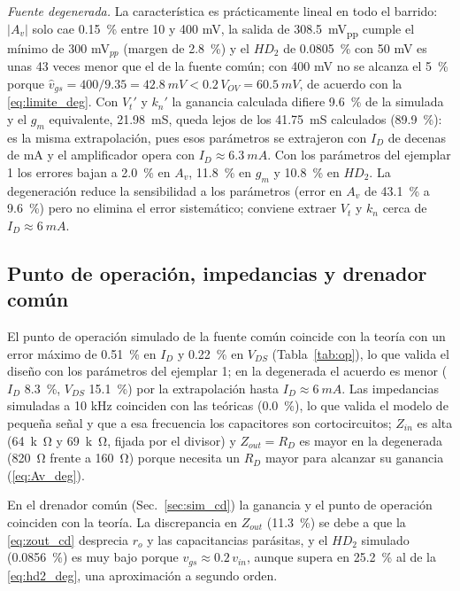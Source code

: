 \documentclass[conference]{IEEEtran}
\newcommand{\gm}{g_m}
\newcommand{\kn}{k_n}
\newcommand{\Vov}{V_{OV}}
\newcommand{\Vtp}{V_t'}
\newcommand{\knp}{k_n'}
\begin{document}
\textit{Fuente degenerada.} La característica es prácticamente lineal en todo el barrido: $|A_v|$ solo cae \SI{0.15}{\percent} entre 10 y 400 mV, la salida de \SI{308.5}{mV_{pp}} cumple el mínimo de 300 mV$_{pp}$ (margen de \SI{2.8}{\percent}) y el $HD_2$ de \SI{0.0805}{\percent} con 50 mV es unas 43 veces menor que el de la fuente común; con 400 mV no se alcanza el \SI{5}{\percent} porque $\hat v_{gs}=400/9.35=\SI{42.8}{mV}<0.2\,\Vov=\SI{60.5}{mV}$, de acuerdo con la \eqref{eq:limite_deg}. Con $\Vtp$ y $\knp$ la ganancia calculada difiere \SI{9.6}{\percent} de la simulada y el $\gm$ equivalente, \SI{21.98}{mS}, queda lejos de los \SI{41.75}{mS} calculados (\SI{89.9}{\percent}): es la misma extrapolación, pues esos parámetros se extrajeron con $I_D$ de decenas de mA y el amplificador opera con $I_D\approx\SI{6.3}{mA}$. Con los parámetros del ejemplar 1 los errores bajan a \SI{2.0}{\percent} en $A_v$, \SI{11.8}{\percent} en $\gm$ y \SI{10.8}{\percent} en $HD_2$. La degeneración reduce la sensibilidad a los parámetros (error en $A_v$ de \SI{43.1}{\percent} a \SI{9.6}{\percent}) pero no elimina el error sistemático; conviene extraer $V_t$ y $\kn$ cerca de $I_D\approx\SI{6}{mA}$.

\subsection{Punto de operación, impedancias y drenador común}
\label{sec:an_op_zin}
El punto de operación simulado de la fuente común coincide con la teoría con un error máximo de \SI{0.51}{\percent} en $I_D$ y \SI{0.22}{\percent} en $V_{DS}$ (Tabla~\ref{tab:op}), lo que valida el diseño con los parámetros del ejemplar 1; en la degenerada el acuerdo es menor ($I_D$ \SI{8.3}{\percent}, $V_{DS}$ \SI{15.1}{\percent}) por la extrapolación hasta $I_D\approx\SI{6}{mA}$. Las impedancias simuladas a 10 kHz coinciden con las teóricas (\SI{0.0}{\percent}), lo que valida el modelo de pequeña señal y que a esa frecuencia los capacitores son cortocircuitos; $Z_{in}$ es alta (\SI{64}{k\ohm} y \SI{69}{k\ohm}, fijada por el divisor) y $Z_{out}=R_D$ es mayor en la degenerada (\SI{820}{\ohm} frente a \SI{160}{\ohm}) porque necesita un $R_D$ mayor para alcanzar su ganancia (\eqref{eq:Av_deg}).

En el drenador común (Sec.~\ref{sec:sim_cd}) la ganancia y el punto de operación coinciden con la teoría. La discrepancia en $Z_{out}$ (\SI{11.3}{\percent}) se debe a que la \eqref{eq:zout_cd} desprecia $r_o$ y las capacitancias parásitas, y el $HD_2$ simulado (\SI{0.0856}{\percent}) es muy bajo porque $v_{gs}\approx0.2\,v_{in}$, aunque supera en \SI{25.2}{\percent} al de la \eqref{eq:hd2_deg}, una aproximación a segundo orden.
\end{document}
